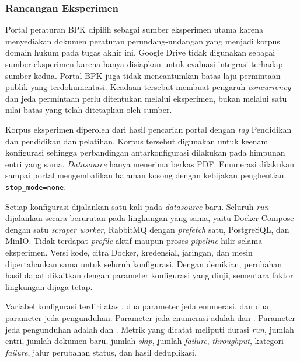 \subsubsection{Rancangan Eksperimen}
\label{sec:rancangan-eksperimen-scraper-bpk}

Portal peraturan BPK dipilih sebagai sumber eksperimen utama karena menyediakan dokumen peraturan perundang-undangan yang menjadi korpus domain hukum pada tugas akhir ini.
Google Drive tidak digunakan sebagai sumber eksperimen karena hanya disiapkan untuk evaluasi integrasi terhadap sumber kedua.
Portal BPK juga tidak mencantumkan batas laju permintaan publik yang terdokumentasi.
Keadaan tersebut membuat pengaruh \textit{concurrency} dan jeda permintaan perlu ditentukan melalui eksperimen, bukan melalui satu nilai batas yang telah ditetapkan oleh sumber.

Korpus eksperimen diperoleh dari hasil pencarian portal dengan \textit{tag} Pendidikan dan pendidikan dan pelatihan.
Korpus tersebut digunakan untuk keenam konfigurasi sehingga perbandingan antarkonfigurasi dilakukan pada himpunan entri yang sama.
\textit{Datasource} hanya menerima berkas PDF.
Enumerasi dilakukan sampai portal mengembalikan halaman kosong dengan kebijakan penghentian \mbox{\texttt{stop\_mode=none}}.

Setiap konfigurasi dijalankan satu kali pada \textit{datasource} baru.
Seluruh \textit{run} dijalankan secara berurutan pada lingkungan yang sama, yaitu Docker Compose dengan satu \textit{scraper worker}, RabbitMQ dengan \textit{prefetch} satu, PostgreSQL, dan MinIO.
Tidak terdapat \textit{profile} aktif maupun proses \textit{pipeline} hilir selama eksperimen.
Versi kode, citra Docker, kredensial, jaringan, dan mesin dipertahankan sama untuk seluruh konfigurasi.
Dengan demikian, perubahan hasil dapat dikaitkan dengan parameter konfigurasi yang diuji, sementara faktor lingkungan dijaga tetap.

Variabel konfigurasi terdiri atas , dua parameter jeda enumerasi, dan dua parameter jeda pengunduhan.
Parameter jeda enumerasi adalah  dan .
Parameter jeda pengunduhan adalah  dan .
Metrik yang dicatat meliputi durasi \textit{run}, jumlah entri, jumlah dokumen baru, jumlah \textit{skip}, jumlah \textit{failure}, \textit{throughput}, kategori \textit{failure}, jalur perubahan status, dan hasil deduplikasi.

